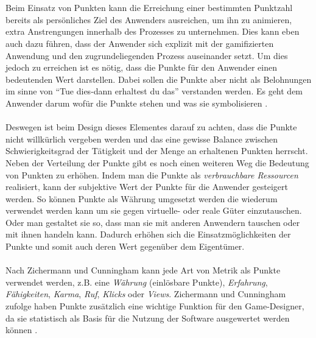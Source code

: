 \documentclass[a4paper,12pt]{scrartcl}
\begin{document}
\\\\
Beim Einsatz von Punkten kann die Erreichung einer bestimmten Punktzahl bereits als persönliches Ziel des Anwenders ausreichen, um ihn zu animieren, extra Anstrengungen innerhalb des Prozesses zu unternehmen. Dies kann eben auch dazu führen, dass der Anwender sich explizit mit der gamifizierten Anwendung und den zugrundeliegenden Prozess auseinander setzt. Um dies jedoch zu erreichen ist es nötig, dass die Punkte für den Anwender einen bedeutenden Wert darstellen. Dabei sollen die Punkte aber nicht als Belohnungen im sinne von \enquote{Tue dies-dann erhaltest du das} verstanden werden. Es geht dem Anwender darum wofür die Punkte stehen und was sie symbolisieren \cite{gamificationDefinition}.     
\\\\  
Deswegen ist beim Design dieses Elementes darauf zu achten, dass die Punkte nicht willkürlich vergeben werden und das eine gewisse Balance zwischen Schwierigkeitsgrad der Tätigkeit und der Menge an erhaltenen Punkten herrscht. Neben der Verteilung der Punkte gibt es noch einen weiteren Weg die Bedeutung von Punkten zu erhöhen. Indem man die Punkte als \textit{verbrauchbare Ressourcen} realisiert, kann der subjektive Wert der Punkte für die Anwender gesteigert werden. So können Punkte als Währung umgesetzt werden die wiederum verwendet werden kann um sie gegen virtuelle- oder reale Güter einzutauschen. Oder man gestaltet sie so, dass man sie mit anderen Anwendern tauschen oder mit ihnen handeln kann. Dadurch erhöhen sich die Einsatzmöglichkeiten der Punkte und somit auch deren Wert gegenüber dem Eigentümer. 
\\\\
Nach Zichermann und Cunningham \cite{Zichermann2011} kann jede Art von Metrik als Punkte verwendet werden, z.B. eine \textit{Währung} (einlösbare Punkte), \textit{Erfahrung}, \textit{Fähigkeiten}, \textit{Karma}, \textit{Ruf}, \textit{Klicks} oder \textit{Views}. Zichermann und Cunningham zufolge haben Punkte zusätzlich eine wichtige Funktion für den Game-Designer, da sie statistisch als Basis für die Nutzung der Software ausgewertet werden können \cite{Zichermann2011}.
\end{document}
